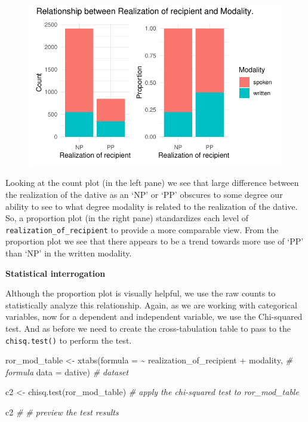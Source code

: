 \documentclass[
  letterpaper,
]{latex/krantz}
\newenvironment{Shaded}{\begin{snugshade}}{\end{snugshade}}
\newcommand{\AttributeTok}[1]{\textcolor[rgb]{0.00,0.00,0.00}{#1}}
\newcommand{\CommentTok}[1]{\textcolor[rgb]{0.00,0.00,0.00}{\textit{#1}}}
\newcommand{\FunctionTok}[1]{\textcolor[rgb]{0.00,0.00,0.00}{#1}}
\newcommand{\NormalTok}[1]{\textcolor[rgb]{0.00,0.00,0.00}{#1}}
\newcommand{\OtherTok}[1]{\textcolor[rgb]{0.00,0.00,0.00}{#1}}
\newcommand{\SpecialCharTok}[1]{\textcolor[rgb]{0.00,0.00,0.00}{#1}}
\begin{document}
\begin{figure}[h]

{\centering \includegraphics{inference_files/figure-pdf/i-bi-cat-visual-1.pdf}

}

\end{figure}

Looking at the count plot (in the left pane) we see that large
difference between the realization of the dative as an `NP' or `PP'
obscures to some degree our ability to see to what degree modality is
related to the realization of the dative. So, a proportion plot (in the
right pane) standardizes each level of
\texttt{realization\_of\_recipient} to provide a more comparable view.
From the proportion plot we see that there appears to be a trend towards
more use of `PP' than `NP' in the written modality.

\textbf{Statistical interrogation}

Although the proportion plot is visually helpful, we use the raw counts
to statistically analyze this relationship. Again, as we are working
with categorical variables, now for a dependent and independent
variable, we use the Chi-squared test. And as before we need to create
the cross-tabulation table to pass to the \texttt{chisq.test()} to
perform the test.

\begin{Shaded}
\begin{Highlighting}[]
\NormalTok{ror\_mod\_table }\OtherTok{\textless{}{-}} 
  \FunctionTok{xtabs}\NormalTok{(}\AttributeTok{formula =} \SpecialCharTok{\textasciitilde{}}\NormalTok{ realization\_of\_recipient }\SpecialCharTok{+}\NormalTok{ modality, }\CommentTok{\# formula }
        \AttributeTok{data =}\NormalTok{ dative) }\CommentTok{\# dataset}

\NormalTok{c2 }\OtherTok{\textless{}{-}} \FunctionTok{chisq.test}\NormalTok{(ror\_mod\_table) }\CommentTok{\# apply the chi{-}squared test to \textasciigrave{}ror\_mod\_table\textasciigrave{}}

\NormalTok{c2 }\CommentTok{\# \# preview the test results}
\end{Highlighting}
\end{Shaded}
\end{document}
